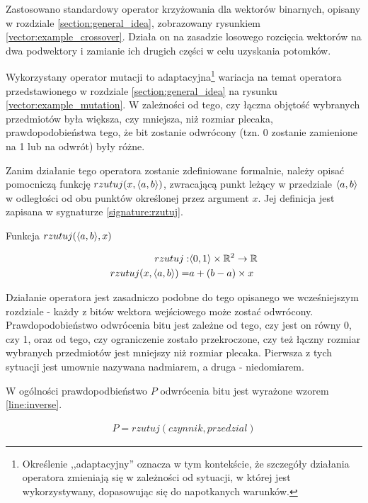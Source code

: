 \documentclass[./FM_mgr.tex]{subfiles}
\begin{document}
	Zastosowano standardowy operator krzyżowania dla wektorów binarnych, opisany w rozdziale \ref{section:general_idea}, zobrazowany rysunkiem \ref{vector:example_crossover}.
	Działa on na zasadzie losowego rozcięcia wektorów na dwa podwektory i zamianie ich drugich części w celu uzyskania potomków.
	
	Wykorzystany operator mutacji to adaptacyjna\footnote{
		Określenie ,,adaptacyjny'' oznacza w tym kontekście, że szczegóły działania operatora zmieniają się w zależności od sytuacji, w której jest wykorzystywany, dopasowując się do napotkanych warunków.
	} wariacja na temat operatora przedstawionego w rozdziale \ref{section:general_idea} na rysunku \ref{vector:example_mutation}.
	W zależności od tego, czy łączna objętość wybranych przedmiotów była większa, czy mniejsza, niż rozmiar plecaka, prawdopodobieństwa tego, że bit zostanie odwrócony (tzn. 0 zostanie zamienione na 1 lub na odwrót) były różne.
	
	Zanim działanie tego operatora zostanie zdefiniowane formalnie, należy opisać pomocniczą funkcję $rzutuj(x, \langle a, b\rangle)$, zwracającą punkt leżący w przedziale $\langle a, b\rangle$ w odległości od obu punktów określonej przez argument $x$.
	Jej definicja jest zapisana w sygnaturze \ref{signature:rzutuj}.
	
	\begin{signature}
		\caption{Funkcja $rzutuj(\langle a, b\rangle, x)$ \label{signature:rzutuj}}
		\begin{align}
		rzutuj: &\langle0, 1\rangle \times \mathbb{R}^2 \rightarrow \mathbb{R} \\
		rzutuj(x, \langle a, b\rangle) =& a + (b-a) \times x
		\end{align}
	\end{signature}
	
	Działanie operatora jest zasadniczo podobne do tego opisanego we wcześniejszym rozdziale - każdy z bitów wektora wejściowego może zostać odwrócony.
	Prawdopodobieństwo odwrócenia bitu jest zależne od tego, czy jest on równy 0, czy 1, oraz od tego, czy ograniczenie zostało przekroczone, czy też łączny rozmiar wybranych przedmiotów jest mniejszy niż rozmiar plecaka.
	Pierwsza z tych sytuacji jest umownie nazywana nadmiarem, a druga - niedomiarem.
	
	W ogólności prawdopodbieństwo $P$ odwrócenia bitu jest wyrażone wzorem \ref{line:inverse}.
	
	\begin{align}
	\label{line:inverse}
	P = rzutuj(czynnik, przedzial)
	\end{align}
	
\end{document}
